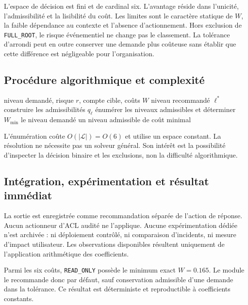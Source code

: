 \documentclass[11pt,a4paper,oneside]{report}
\theoremstyle{definition}
\theoremstyle{plain}
\begin{document}
L'espace de décision est fini et de cardinal six. L'avantage réside dans l'unicité, l'admissibilité et la lisibilité du coût. Les limites sont le caractère statique de $W$, la faible dépendance au contexte et l'absence d'actionnement. Hors exclusion de \texttt{FULL\_ROOT}, le risque événementiel ne change pas le classement. La tolérance d'arrondi peut en outre conserver une demande plus coûteuse sans établir que cette différence est négligeable pour l'organisation.

\subsection*{Procédure algorithmique et complexité}

\begin{algorithm}[H]
\caption{Recommandation consultative de privilège}
\label{alg:ai-ro-privilege}
\begin{algorithmic}[1]
\Require niveau demandé, risque $r$, compte cible, coûts $W$
\Ensure niveau recommandé $\ell^*$
\State construire les admissibilités $q_\ell$
\State énumérer les niveaux admissibles et déterminer $W_{\min}$
  \State \Return le niveau demandé
\Else
  \State \Return un niveau admissible de coût minimal
\EndIf
\end{algorithmic}
\end{algorithm}

L'énumération coûte $O(|\mathcal{L}|)=O(6)$ et utilise un espace constant. La résolution ne nécessite pas un solveur général. Son intérêt est la possibilité d'inspecter la décision binaire et les exclusions, non la difficulté algorithmique.

\subsection*{Intégration, expérimentation et résultat immédiat}

La sortie est enregistrée comme recommandation séparée de l'action de réponse. Aucun actionneur d'ACL audité ne l'applique. Aucune expérimentation dédiée n'est archivée : ni déploiement contrôlé, ni comparaison d'incidents, ni mesure d'impact utilisateur. Les observations disponibles résultent uniquement de l'application arithmétique des coefficients.

Parmi les six coûts, \texttt{READ\_ONLY} possède le minimum exact
$W=0.165$. Le module le recommande donc par défaut, sauf conservation admissible d'une demande dans la tolérance. Ce résultat est déterministe et reproductible à coefficients constants.
\end{document}
